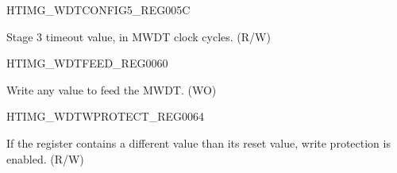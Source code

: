 \begin{register}{H}{TIMG\_WDTCONFIG5\_REG}{\hexprefix{}005C}\label{regdesc:TIMGWDTCONFIG5REG}
%
\regnewline%
\begin{regdesc}\begin{reglist}
\label{fielddesc:TIMGWDTSTG3HOLD}\item [TIMG\_WDT\_STG3\_HOLD] Stage 3 timeout value, in MWDT clock cycles. (R/W)
\end{reglist}\end{regdesc}
\end{register}


\begin{register}{H}{TIMG\_WDTFEED\_REG}{\hexprefix{}0060}\label{regdesc:TIMGWDTFEEDREG}
%
\regnewline%
\begin{regdesc}\begin{reglist}
\label{fielddesc:TIMGWDTFEED}\item [TIMG\_WDT\_FEED] Write any value to feed the MWDT. (WO)
\end{reglist}\end{regdesc}
\end{register}


\begin{register}{H}{TIMG\_WDTWPROTECT\_REG}{\hexprefix{}0064}\label{regdesc:TIMGWDTWPROTECTREG}
%
\regnewline%
\begin{regdesc}\begin{reglist}
\label{fielddesc:TIMGWDTWKEY}\item [TIMG\_WDT\_WKEY] If the register contains a different value than its reset value, write protection is enabled. (R/W)
\end{reglist}\end{regdesc}
\end{register}


